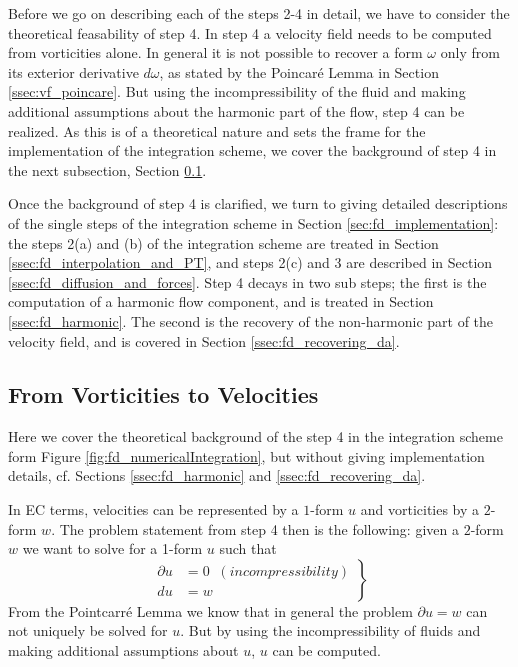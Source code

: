 Before we go on describing each of the steps 2-4 in detail, we have to consider the theoretical feasability of step 4.
In step 4 a velocity field needs to be computed from vorticities alone. In general it is not possible to recover a form $\omega$ only from its exterior derivative $d\omega$, as stated by the Poincar\'e Lemma in Section \ref{ssec:vf_poincare}. But using the incompressibility of the fluid and making additional assumptions about the harmonic part of the flow, step 4 can be realized. As this is of a theoretical nature and sets the frame for the implementation of the integration scheme, we cover the background of step 4 in the next subsection, Section \ref{subsec:fd_vort2vel}.

Once the background of step 4 is clarified, we turn to giving detailed descriptions of the single steps of the integration scheme in Section \ref{sec:fd_implementation}: the steps 2(a) and (b) of the integration scheme are treated in Section \ref{ssec:fd_interpolation_and_PT}, and steps 2(c) and 3 are described in Section \ref{ssec:fd_diffusion_and_forces}. Step 4 decays in two sub steps; the first is the computation of a harmonic flow component, and is treated in Section \ref{ssec:fd_harmonic}. The second is the recovery of the non-harmonic part of the velocity field, and is covered in Section \ref{ssec:fd_recovering_da}.



\subsection{From Vorticities to Velocities}
\label{subsec:fd_vort2vel}

Here we cover the theoretical background of the step 4 in the integration scheme form Figure \ref{fig:fd_numericalIntegration}, but without giving implementation details, cf. Sections \ref{ssec:fd_harmonic} and \ref{ssec:fd_recovering_da}. 

In EC terms, velocities can be represented by a $1$-form $u$ and vorticities by a $2$-form $w$.
 The problem statement from step 4 then is the following: given a $2$-form $w$ we want to solve for a 1-form $u$ such that
\begin{equation*}\left.\begin{aligned}\partial u &= 0 \;\; (incompressibility) \\ 
du &= w \end{aligned}\right\}\end{equation*}
From the Pointcarr\'e Lemma we know that   in general  the problem $\partial u = w$ can not uniquely be solved for $u$. But by using the incompressibility of fluids and making additional assumptions about $u$, $u$ can be computed. 

